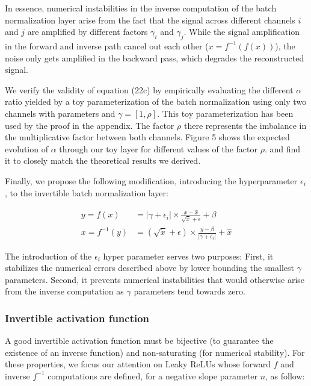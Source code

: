 \documentclass[twocolumn]{bmcart}
\begin{document}
In essence, numerical instabilities in the inverse computation of the batch normalization layer arise
from the fact that the signal across different channels $i$ and $j$ are amplified by different factors $\gamma_i$ and $\gamma_j$.
While the signal amplification in the forward and inverse path cancel out each other ($x=f^{-1}(f(x))$),
the noise only gets amplified in the backward pass, which degrades the reconstructed signal.

We verify the validity of equation (22c) by empirically evaluating the different $\alpha$ ratio yielded by a
toy parameterization of the batch normalization using only two channels with parameters and $\gamma = [1, \rho]$.
This toy parameterization has been used by the proof in the appendix.
The factor $\rho$ there represents the imbalance in the multiplicative factor between both channels.
Figure 5 shows the expected evolution of $\alpha$ through our toy layer for different values of the factor $\rho$.
and find it to closely match the theoretical results we derived.

Finally, we propose the following modification, introducing the hyperparameter $\epsilon_i$, to the invertible batch normalization layer:

\begin{subequations}
\begin{align}
y = f(x) &= |\gamma + \epsilon_i| \times \frac{x - \hat{x}}{\sqrt{\dot{x}} + \epsilon} + \beta \\
x = f^{-1}(y) &= (\sqrt{\dot{x}} + \epsilon) \times \frac{y -  \beta}{|\gamma + \epsilon_i|}  + \hat{x}
\end{align}
\end{subequations}

The introduction of the $\epsilon_i$ hyper parameter serves two purposes:
First, it stabilizes the numerical errors described above by lower bounding the smallest $\gamma$ parameters.
Second, it prevents numerical instabilities that would otherwise
arise from the inverse computation as $\gamma$ parameters tend towards zero.

\subsubsection{Invertible activation function}

A good invertible activation function must be bijective (to guarantee the existence of an inverse function) and non-saturating (for numerical stability).
For these properties, we focus our attention on Leaky ReLUs whose forward $f$ and inverse $f^{-1}$ computations are defined,
for a negative slope parameter $n$, as follow:
\end{document}
